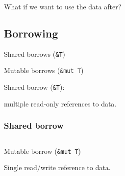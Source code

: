 \documentclass{beamer}
\begin{document}
\begin{frame}
    \inputminted[fontsize=\scriptsize]{rust}{code/ownership.rs}
\end{frame}

\begin{frame}
    \inputminted[fontsize=\scriptsize]{rust}{code/ownership2.rs}
\end{frame}

\begin{frame}
    \inputminted[fontsize=\scriptsize]{rust}{code/ownership3.rs}
\end{frame}

\begin{frame}
    \begin{center}
        What if we want to use the data after?
    \end{center}
\end{frame}

\subsection{Borrowing}

\begin{frame}
    \begin{center}
        Shared borrows (\texttt{\&T})

        \vspace{3em}

        Mutable borrows (\texttt{\&mut T})
    \end{center}
\end{frame}

\begin{frame}
    \begin{center}
        Shared borrow (\texttt{\&T}):

        \vspace{3em}
        
        multiple read-only references to data.
    \end{center}
\end{frame}

\begin{frame}
    \frametitle{Shared borrow}
    \inputminted[fontsize=\scriptsize]{rust}{code/shared_borrow.rs}
\end{frame}

\begin{frame}
    \begin{center}
        Mutable borrow (\texttt{\&mut T})
        
        \vspace{3em}
        
        Single read/write reference to data.
    \end{center}
\end{frame}
\end{document}
